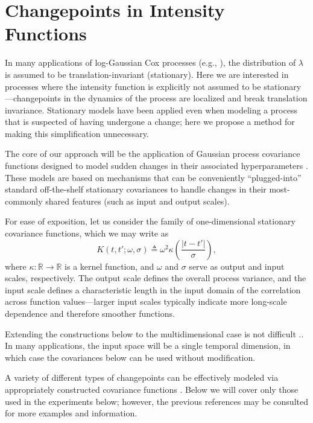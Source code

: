 \documentclass{article}
\newcommand{\deq}{\triangleq}
\newcommand{\R}{\mathbb{R}}
\begin{document}
\section{Changepoints in Intensity Functions}
\label{changepoints}

In many applications of log-Gaussian Cox processes (e.g.,
\citep{moller, diggle, adams}), the distribution of $\lambda$ is
assumed to be translation-invariant (stationary).  Here we are
interested in processes where the intensity function is explicitly not
assumed to be stationary---changepoints in the dynamics of the process
are localized and break translation invariance.  Stationary models
have been applied \citep{adams} even when modeling a process that is
suspected of having undergone a change; here we propose a method for
making this simplification unnecessary.

The core of our approach will be the application of Gaussian process
covariance functions designed to model sudden changes in their
associated hyperparameters \citep{cpcj}.  These models are based on
mechanisms that can be conveniently ``plugged-into'' standard
off-the-shelf stationary covariances to handle changes in their
most-commonly shared features (such as input and output scales).

For ease of exposition, let us consider the family of one-dimensional
stationary covariance functions, which we may write as
\begin{equation*}
  K(t, t'; \omega, \sigma)
  \deq
  \omega^2
  \kappa\left( \frac{\lvert t - t' \rvert}{\sigma} \right),
\end{equation*}
where $\kappa\colon \R \to \R$ is a kernel function, and $\omega$ and
$\sigma$ serve as output and input scales, respectively.  The output
scale defines the overall process variance, and the input scale
defines a characteristic length in the input domain of the correlation
across function values---larger input scales typically indicate more
long-scale dependence and therefore smoother functions.

Extending the constructions below to the multidimensional case is not
difficult \citep{gpml}..  In many applications, the input space will be a single
temporal dimension, in which case the covariances below can be used
without modification.

A variety of different types of changepoints can be effectively
modeled via appropriately constructed covariance functions
\citep{cpcj, thesis}.  Below we will cover only those used in the
experiments below; however, the previous references may be consulted
for more examples and information.
\end{document}
